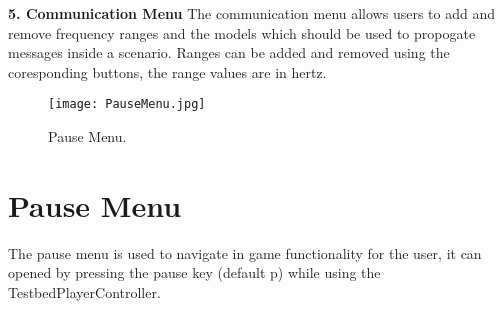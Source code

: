 \documentclass[../main.tex]{subfiles}
\begin{document}
\textbf{5. Communication Menu}
The communication menu allows users to add and remove frequency ranges and the models which should be used to propogate messages inside a scenario. Ranges can be added and removed using the coresponding buttons, the range values are in hertz.

\break

\begin{figure}[H]
\texttt{[image: PauseMenu.jpg]}
\caption{Pause Menu.}
\end{figure}

\section{Pause Menu}
The pause menu is used to navigate in game functionality for the user, it can opened by pressing the pause key (default p) while using the TestbedPlayerController.
\end{document}
